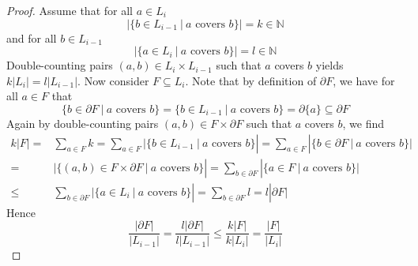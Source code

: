 \documentclass{scrartcl}
\newcommand{\N}{\mathbb{N}}
\theoremstyle{definition}
\begin{document}
\begin{proof}
    Assume that for all $a \in L_i$
    \begin{equation*}
        |\{ b \in L_{i - 1} \ | \ \text{$a$ covers $b$} \}| = k \in \N
    \end{equation*}
    and for all $b \in L_{i - 1}$
    \begin{equation*}
        |\{ a \in L_i \ | \ \text{$a$ covers $b$} \}| = l \in \N
    \end{equation*}
    Double-counting pairs $(a, b) \in L_i \times L_{i - 1}$ such that $a$ covers $b$ yields $k|L_i| = l|L_{i - 1}|$.
    Now consider $F \subseteq L_i$.
    Note that by definition of $\partial F$, we have for all $a \in F$ that
    \begin{equation*}
        \{ b \in \partial F \ | \ \text{$a$ covers $b$} \} = \{ b \in L_{i - 1} \ | \ \text{$a$ covers $b$} \} = \partial \{a\} \subseteq \partial F
    \end{equation*}
    Again by double-counting pairs $(a, b) \in F \times \partial F$ such that $a$ covers $b$, we find
    \begin{align*}
        k|F| =& \sum_{a \in F} k = \sum_{a \in F} |\{ b \in L_{i - 1} \ | \ \text{$a$ covers $b$} \}| = \sum_{a \in F} |\{ b \in \partial F \ | \ \text{$a$ covers $b$} \}| \\
        =& |\{ (a, b) \in F \times \partial F \ | \ \text{$a$ covers $b$} \}| = \sum_{b \in \partial F} |\{ a \in F \ | \ \text{$a$ covers $b$}\}| \\
        \leq& \sum_{b \in \partial F} |\{ a \in L_i \ | \ \text{$a$ covers $b$}\}| = \sum_{b \in \partial F} l = l |\partial F|
    \end{align*}
    Hence
    \begin{equation*}
        \frac {|\partial F|} {|L_{i - 1}|} = \frac {l |\partial F|} {l |L_{i - 1}|} \leq \frac {k |F|} {k |L_i|} = \frac {|F|} {|L_i|}
    \end{equation*}
\end{proof}
\end{document}
